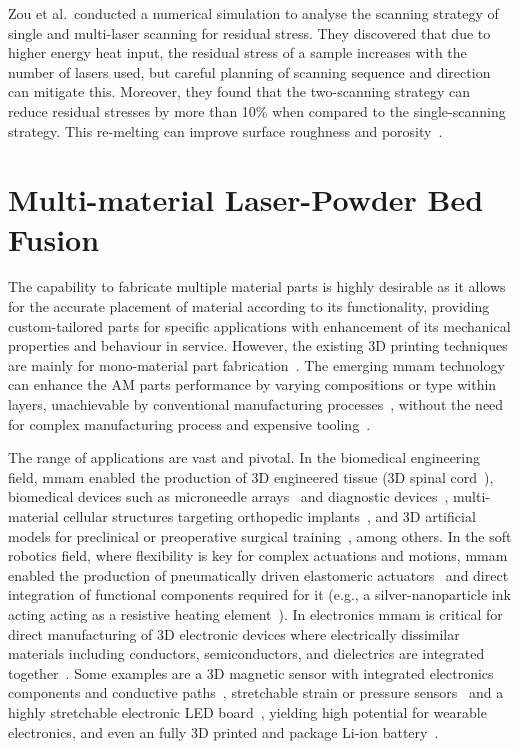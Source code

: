 Zou et al.~conducted a numerical simulation to analyse the scanning strategy of single and multi-laser scanning for residual stress\cite{zou2020numerical}. They discovered that due to higher energy heat input, the residual stress of a sample increases with the number of lasers used, but careful planning of scanning sequence and direction can mitigate this. Moreover, they found that the two-scanning strategy can reduce residual stresses by more than 10\% when compared to the single-scanning strategy. This re-melting can improve surface roughness and porosity~\cite{yu2019influence}.

\section{Multi-material Laser-Powder Bed Fusion}%
\label{sec:mult-laser-powd}
The capability to fabricate multiple material parts is highly desirable as it
allows for the accurate placement of material according to its functionality,
providing custom-tailored parts for specific applications with enhancement of
its mechanical properties and behaviour in service.
However, the existing 3D printing techniques are mainly for
mono-material part fabrication~\cite{wei2020overview}.
The emerging \gls{mmam} technology can
enhance the AM parts performance by varying compositions or type within layers,
unachievable by conventional manufacturing processes~\cite{vaezi2013multiple}, 
without the need for complex manufacturing process and expensive
tooling~\cite{han2020recent,bandyopadhyay2018additive}.

The range of applications are vast and pivotal. In the biomedical engineering
field, \gls{mmam} enabled the production of 3D engineered tissue (3D spinal
cord~\cite{joung20183d}), biomedical devices such as microneedle
arrays~\cite{lu2015microstereolithography} and diagnostic
devices~\cite{li2018multimaterial}, multi-material cellular structures targeting
orthopedic implants~\cite{bartolomeu2020additive}, and
3D artificial models for preclinical or preoperative surgical
training~\cite{coelho2018multimaterial,cresswell2018approaches}, among others.
%
In the soft robotics field, where flexibility is key for complex actuations and
motions, \gls{mmam} enabled the production of pneumatically driven elastomeric
actuators~\cite{sydney2016biomimetic} and direct integration of functional components required for it (e.g.,
a silver-nanoparticle ink acting acting as a resistive heating
element~\cite{yuan20173d}).
%
In electronics \gls{mmam} is critical for direct manufacturing of 3D electronic
devices where electrically dissimilar materials including conductors,
semiconductors, and dielectrics are integrated
together~\cite{han2020recent}. Some examples are a 3D magnetic sensor with
integrated electronics components and conductive paths~\cite{espalin20143d}, stretchable strain or
pressure sensors~\cite{valentine2017hybrid} and a highly stretchable electronic LED board~\cite{huangagoh2018highly}, yielding high
potential for wearable electronics, and even an fully 3D printed and package
Li-ion battery~\cite{wei20183d}. 


